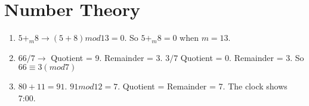 \documentclass[11pt]{article}
\begin{document}
\section{Number Theory}

\begin{enumerate}[label=(\alph*)]

\item
$5+_m8\rightarrow (5+8)mod13=0$. So $5+_m8=0$ when $m=13$.

\item
$66/7 \rightarrow$ Quotient = 9. Remainder = 3. $3/7$ Quotient = 0. Remainder = 3. So $66\equiv3(mod7)$

\item
$80+11=91$. $91mod12=7$. Quotient = Remainder = 7. The clock shows 7:00.

\end{enumerate}
\end{document}
